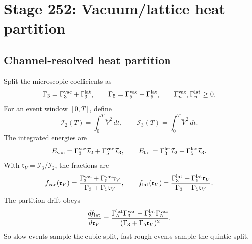 \section[Stage 252]{Stage 252: Vacuum/lattice heat partition}
\label{stage:252}




\subsection{Channel-resolved heat partition}
\label{subsec:app-part08-stage252-heat-partition}

Split the microscopic coefficients as
\begin{equation}
\label{eq:app-part08-stage252-split}
\Gamma_3=\Gamma_3^{\rm vac}+\Gamma_3^{\rm lat},
\qquad
\Gamma_5=\Gamma_5^{\rm vac}+\Gamma_5^{\rm lat},
\qquad
\Gamma_n^{\rm vac},\Gamma_n^{\rm lat}\ge0.
\end{equation}
For an event window \([0,T]\), define
\begin{equation}
\label{eq:app-part08-stage252-shape-integrals}
\mathcal I_2(T)=\int_0^T\ddot V^{2}\,dt,
\qquad
\mathcal I_3(T)=\int_0^T\dddot V^{2}\,dt.
\end{equation}
The integrated energies are
\begin{equation}
\label{eq:app-part08-stage252-evac-elat}
E_{\rm vac}=\Gamma_3^{\rm vac}\mathcal I_2+\Gamma_5^{\rm vac}\mathcal I_3,
\qquad
E_{\rm lat}=\Gamma_3^{\rm lat}\mathcal I_2+\Gamma_5^{\rm lat}\mathcal I_3.
\end{equation}
With \(\mathfrak r_V=\mathcal I_3/\mathcal I_2\), the fractions are
\begin{equation}
\label{eq:app-part08-stage252-fractions}
f_{\rm vac}(\mathfrak r_V)=
\frac{\Gamma_3^{\rm vac}+\Gamma_5^{\rm vac}\mathfrak r_V}{\Gamma_3+\Gamma_5\mathfrak r_V},
\qquad
f_{\rm lat}(\mathfrak r_V)=
\frac{\Gamma_3^{\rm lat}+\Gamma_5^{\rm lat}\mathfrak r_V}{\Gamma_3+\Gamma_5\mathfrak r_V}.
\end{equation}
The partition drift obeys
\begin{equation}
\label{eq:app-part08-stage252-fraction-drift}
\frac{df_{\rm lat}}{d\mathfrak r_V}
=
\frac{\Gamma_5^{\rm lat}\Gamma_3^{\rm vac}-\Gamma_3^{\rm lat}\Gamma_5^{\rm vac}}{(\Gamma_3+\Gamma_5\mathfrak r_V)^2}.
\end{equation}
So slow events sample the cubic split, fast rough events sample the quintic split.

